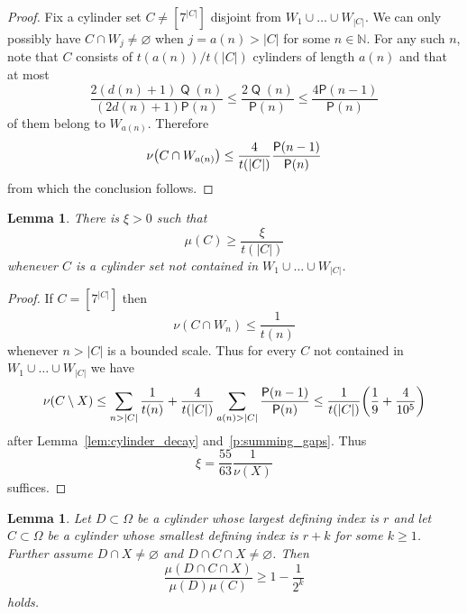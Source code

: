 \documentclass[10pt]{amsart}
\newtheorem{lemm}[theo]{Lemma}\newtheorem{prop}[theo]{Proposition}\newtheorem{coro}[theo]{Corollary}\newtheorem{conj}[theo]{Conjecture}
\theoremstyle{definition}\newtheorem{defi}[theo]{Definition}\newtheorem{rema}[theo]{Remark}\newtheorem{exam}[theo]{Example}\newtheorem{exem}[theo]{Example}\newtheorem{nota}[theo]{Notation}
\DeclareMathOperator{\Q}{\mathsf{Q}}
\newcommand{\N}{\mathbb{N}}
\renewcommand{\P}{\mathsf{P}}
\renewcommand{\emptyset}{\varnothing}
\let\originalleft\left
\let\originalright\right
\renewcommand{\left}{\mathopen{}\mathclose\bgroup\originalleft}
\renewcommand{\right}{\aftergroup\egroup\originalright}
\begin{document}
\pagebreak{}
\begin{proof}
Fix a cylinder set $C \ne [7^{|C|}]$ disjoint from $W_1 \cup \dots \cup W_{|C|}$. We can only possibly have $C \cap W_j \ne \emptyset$ when $j = a(n) > |C|$ for some $n \in \N$. For any such $n$, note that $C$ consists of $t(a(n)) / t(|C|)$ cylinders of length $a(n)$ and that at most
\[
\frac{2 (d(n) + 1) \Q(n)}{(2d(n)+1) \P(n)}
\le
\frac{2 \Q(n)}{\P(n)}
\le
\frac{4 \P(n-1)}{\P(n)}
\]
of them belong to $W_{a(n)}$. Therefore
\[
\nu\left(C \cap W_{a(n)}\right) \le \frac{4}{t(|C|)} \frac{\P(n-1)}{\P(n)}
\]
from which the conclusion follows.
\end{proof}


\begin{lemm}\label{lem:cylinder_size}
There is $\xi > 0$ such that
\[
\mu(C) \ge \frac{\xi}{t(|C|)}
\]
whenever $C$ is a cylinder set not contained in $W_1 \cup \dots \cup W_{|C|}$.
\end{lemm}
\begin{proof}
If $C = [7^{|C|}]$ then
\[
\nu(C \cap W_n) \le \frac{1}{t(n)}
\]
whenever $n > |C|$ is a bounded scale. Thus for every $C$ not contained in $W_1 \cup \dots \cup W_{|C|}$ we have
\[
\nu(C \setminus X)
\le
\sum_{n > |C|} \frac{1}{t(n)} + \frac{4}{t(|C|)} \sum_{a(n) > |C|} \frac{\P(n-1)}{\P(n)}
\le
\frac{1}{t(|C|)} \left(\frac{1}{9} + \frac{4}{10^5} \right)
\]
after Lemma~\ref{lem:cylinder_decay} and~\ref{p:summing_gaps}. Thus
\[
\xi = \frac{55}{63} \frac{1}{\nu(X)}
\]
suffices.
\end{proof}

\begin{lemm}\label{lem:indep}
Let $D \subset \Omega$ be a cylinder whose largest defining index is $r$ and let $C \subset \Omega$ be a cylinder whose smallest defining index is $r+k$ for some $k \ge 1$. Further assume $D \cap X \neq \emptyset$ and $D \cap C \cap X \neq \emptyset$. Then
\[
\frac{\mu(D\cap C \cap X)}{\mu(D)\mu(C)}\geq 1-\frac{1}{2^k}
\]
holds.
\end{lemm}
\end{document}
